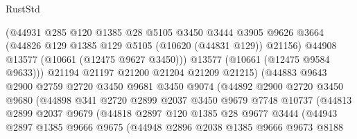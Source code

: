 \begin{lexlean}{RustStd}
\begin{coremodule}
                            (@44931
                              @285
                              @120
                              @1385
                              @28
                              @5105
                              @3450
                              @3444
                              @3905
                              @9626
                              @3664
                              (@44826 @129 @1385 @129 @5105 (@10620 (@44831 @129)) @21156)
                              @44908
                              @13577
                              (@10661 (@12475 @9627 @3450)))
                            @13577
                            (@10661 (@12475 @9584 @9633)))
                          @21194
                          @21197
                          @21200
                          @21204
                          @21209
                          @21215)
                        (@44883
                          @9643
                          @2900
                          @2759
                          @2720
                          @3450
                          @9681
                          @3450
                          @9074
                          (@44892
                            @2900
                            @2720
                            @3450
                            @9680
                            (@44898
                              @341
                              @2720
                              @2899
                              @2037
                              @3450
                              @9679
                              @7748
                              @10737
                              (@44813
                                @2899
                                @2037
                                @9679
                                (@44818
                                  @2897
                                  @120
                                  @1385
                                  @28
                                  @9677
                                  @3444
                                  (@44943
                                    @2897
                                    @1385
                                    @9666
                                    @9675
                                    (@44948
                                      @2896
                                      @2038
                                      @1385
                                      @9666
                                      @9673
                                      @8188

\end{coremodule}
\end{lexlean}

